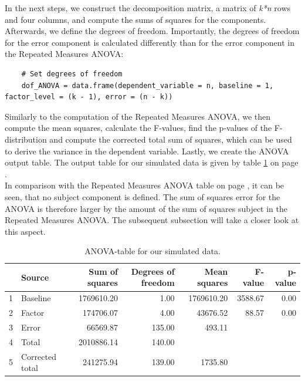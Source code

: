 \documentclass[11pt]{article}
\begin{document}
	In the next steps, we construct the decomposition matrix, a matrix of \textit{k*n} rows and four columns, and compute the sums of squares for the components. Afterwards, we define the degrees of freedom. Importantly, the degrees of freedom for the error component is calculated differently than for the error component in the Repeated Measures ANOVA:\\
	
	\begin{lstlisting}   
	# Set degrees of freedom
	dof_ANOVA = data.frame(dependent_variable = n, baseline = 1, factor_level = (k - 1), error = (n - k))
	\end{lstlisting}          
	
	Similarly to the computation of the Repeated Measures ANOVA, we then compute the mean squares, calculate the F-values, find the p-values of the F-distribution and compute the corrected total sum of squares, which can be used to derive the variance in the dependent variable. Lastly, we create the ANOVA output table. The output table for our simulated data is given by table \ref{table:outputtable2} on page \pageref{table:outputtable2}.\\
	
	In comparison with the Repeated Measures ANOVA table on page \pageref{table:outputtable1}, it can be seen, that no subject component is defined. The sum of squares error for the ANOVA is therefore larger by the amount of the sum of squares subject in the Repeated Measures ANOVA. The subsequent subsection will take a closer look at this aspect.
	
	
	\begin{table}[ht]
		\centering
		\begin{tabular}{rlrrrrr}
			\hline
			& Source & Sum of squares & Degrees of freedom & Mean squares & F-value & p-value \\ 
			\hline
			1 & Baseline & 1769610.20 & 1.00 & 1769610.20 & 3588.67 & 0.00 \\ 
			2 & Factor & 174706.07 & 4.00 & 43676.52 & 88.57 & 0.00 \\ 
			3 & Error & 66569.87 & 135.00 & 493.11 &  &  \\ 
			4 & Total & 2010886.14 & 140.00 &  &  &  \\ 
			5 & Corrected total & 241275.94 & 139.00 & 1735.80 &  &  \\ 
			\hline
		\end{tabular}
		\caption{ANOVA-table for our simulated data.}\label{table:outputtable2}
	\end{table}
	
\end{document}
